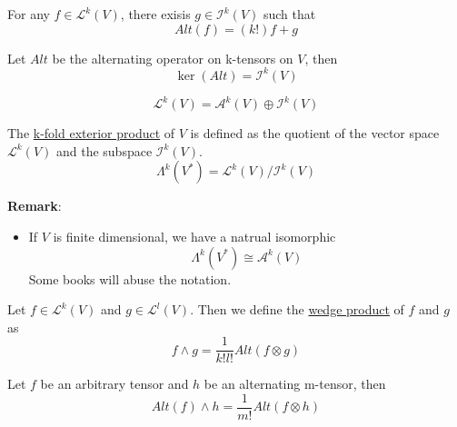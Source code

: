 \begin{corollary}
    For any $f\in\mathcal{L}^k(V)$, there exisis $g\in\mathcal{I}^k(V)$ such that $$Alt(f)=(k!)f+g$$
\end{corollary}

\begin{theorem}
    Let $Alt$ be the alternating operator on k-tensors on $V$, then $$\ker(Alt)=\mathcal{I}^k(V)$$
\end{theorem}

\begin{corollary}
    $$\mathcal{L}^k(V)=\mathcal{A}^k(V) \oplus \mathcal{I}^k(V)$$
\end{corollary}

\begin{definition}
    The \underline{k-fold exterior product} of $V$ is defined as the quotient of the vector space $\mathcal{L}^k(V)$ and the subspace $\mathcal{I}^k(V)$. $$\Lambda^k(V^*)=\mathcal{L}^k(V)/\mathcal{I}^k(V)$$
\end{definition}

\noindent\textbf{Remark}:
\begin{itemize}
    \item If $V$ is finite dimensional, we have a natrual isomorphic
    $$\Lambda^k(V^*)\cong \mathcal{A}^k(V)$$
    Some books will abuse the notation.
\end{itemize}

\begin{definition}
    Let $f\in\mathcal{L}^k(V)$ and $g\in \mathcal{L}^l(V)$. Then we define the \underline{wedge product} of $f$ and $g$ as $$f \wedge g=\frac{1}{k!l!}Alt(f\otimes g)$$
\end{definition}

\begin{lemma}
    Let $f$ be an arbitrary tensor and $h$ be an alternating m-tensor, then $$Alt(f)\wedge h=\frac{1}{m!}Alt(f\otimes h)$$
\end{lemma}

